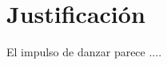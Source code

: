 \chapter{Justificación}
\label{chp:justificacion}
El impulso de danzar parece ....
\vspace{0.5cm}


